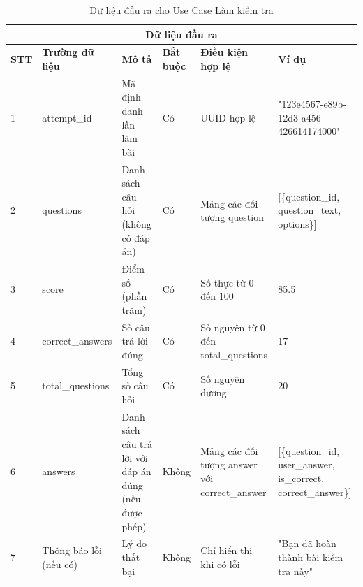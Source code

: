 \documentclass[../DoAn.tex]{subfiles}
\begin{document}
\vspace{0.5cm}

\begin{table}[h!]
\centering
\begin{tabular}{|m{1cm}|m{2.5cm}|m{3cm}|m{1cm}|m{2.5cm}|m{3.5cm}|}
    \hline
    \multicolumn{6}{|c|}{\textbf{Dữ liệu đầu ra}} \\
    \hline
    \textbf{STT} & \textbf{Trường dữ liệu} & \textbf{Mô tả} & \textbf{Bắt buộc} & \textbf{Điều kiện hợp lệ} & \textbf{Ví dụ} \\
    \hline
    1 & attempt\_id & Mã định danh lần làm bài & Có & UUID hợp lệ & "123e4567-e89b-12d3-a456-426614174000" \\
    \hline
    2 & questions & Danh sách câu hỏi (không có đáp án) & Có & Mảng các đối tượng question & [\{question\_id, question\_text, options\}] \\
    \hline
    3 & score & Điểm số (phần trăm) & Có & Số thực từ 0 đến 100 & 85.5 \\
    \hline
    4 & correct\_answers & Số câu trả lời đúng & Có & Số nguyên từ 0 đến total\_questions & 17 \\
    \hline
    5 & total\_questions & Tổng số câu hỏi & Có & Số nguyên dương & 20 \\
    \hline
    6 & answers & Danh sách câu trả lời với đáp án đúng (nếu được phép) & Không & Mảng các đối tượng answer với correct\_answer & [\{question\_id, user\_answer, is\_correct, correct\_answer\}] \\
    \hline
    7 & Thông báo lỗi (nếu có) & Lý do thất bại & Không & Chỉ hiển thị khi có lỗi & "Bạn đã hoàn thành bài kiểm tra này" \\
    \hline
\end{tabular}
\caption{Dữ liệu đầu ra cho Use Case Làm kiểm tra}
\end{table}

\vspace{1cm}

\end{document}
